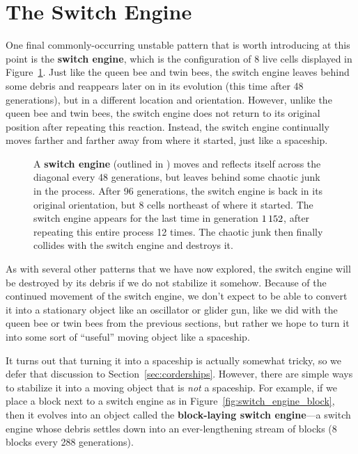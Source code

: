 \section{The Switch Engine}\label{sec:switch_engine}

One final commonly-occurring unstable pattern that is worth introducing at this point is the \textbf{switch engine}, which is the configuration of 8 live cells displayed in Figure~\ref{fig:switch_engine}. Just like the queen bee and twin bees, the switch engine leaves behind some debris and reappears later on in its evolution (this time after 48 generations), but in a different location and orientation. However, unlike the queen bee and twin bees, the switch engine does not return to its original position after repeating this reaction. Instead, the switch engine continually moves farther and farther away from where it started, just like a spaceship.

\begin{figure}[!htb]
	\centering{}
	\caption{A \textbf{switch engine} (outlined in ) moves and reflects itself across the diagonal every 48 generations, but leaves behind some chaotic junk in the process. After 96 generations, the switch engine is back in its original orientation, but 8 cells northeast of where it started. The switch engine appears for the last time in generation $1{\,}152$, after repeating this entire process 12 times. The chaotic junk then finally collides with the switch engine and destroys it.}\label{fig:switch_engine}
\end{figure}

As with several other patterns that we have now explored, the switch engine will be destroyed by its debris if we do not stabilize it somehow. Because of the continued movement of the switch engine, we don't expect to be able to convert it into a stationary object like an oscillator or glider gun, like we did with the queen bee or twin bees from the previous sections, but rather we hope to turn it into some sort of ``useful'' moving object like a spaceship.

It turns out that turning it into a spaceship is actually somewhat tricky, so we defer that discussion to Section~\ref{sec:corderships}. However, there are simple ways to stabilize it into a moving object that is \emph{not} a spaceship. For example, if we place a block next to a switch engine as in Figure~\ref{fig:switch_engine_block}, then it evolves into an object called the \textbf{block-laying switch engine}---a switch engine whose debris settles down into an ever-lengthening stream of blocks (8 blocks every 288 generations).

